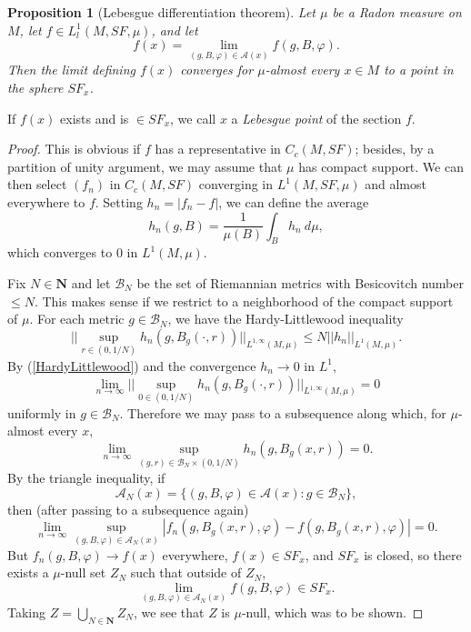 \documentclass[reqno,12pt,letterpaper]{amsart}
\newcommand{\NN}{\mathbf{N}}
\newcommand{\dfn}[1]{\emph{#1}\index{#1}}
\newtheorem{proposition}[theorem]{Proposition}
\theoremstyle{definition}
\numberwithin{equation}{section}
\begin{document}
\begin{proposition}[Lebesgue differentiation theorem]
Let $\mu$ be a Radon measure on $M$, let $f \in L^1_l(M, SF, \mu)$, and let
$$f(x) = \lim_{(g, B, \varphi) \in \mathcal A(x)} f(g, B, \varphi).$$
Then the limit defining $f(x)$ converges for $\mu$-almost every $x \in M$ to a point in the sphere $SF_x$.
\end{proposition}
If $f(x)$ exists and is $\in SF_x$, we call $x$ a \dfn{Lebesgue point} of the section $f$.
\begin{proof}
This is obvious if $f$ has a representative in $C_c(M, SF)$; besides, by a partition of unity argument, we may assume that $\mu$ has compact support.
We can then select $(f_n)$ in $C_c(M, SF)$ converging in $L^1(M, SF, \mu)$ and almost everywhere to $f$.
Setting $h_n = |f_n - f|$, we can define the average
$$h_n(g, B) = \frac{1}{\mu(B)} \int_B h_n ~d\mu,$$
which converges to $0$ in $L^1(M, \mu)$.

Fix $N \in \NN$ and let $\mathcal B_N$ be the set of Riemannian metrics with Besicovitch number $\leq N$.
This makes sense if we restrict to a neighborhood of the compact support of $\mu$.
For each metric $g \in \mathcal B_N$, we have the Hardy-Littlewood inequality \cite[Lemma 4.1.1a]{Ledrappier85}
\begin{equation}\label{HardyLittlewood}
||\sup_{r \in (0, 1/N)} h_n(g, B_g(\cdot, r))||_{L^{1, \infty}(M, \mu)} \leq N ||h_n||_{L^1(M, \mu)}.
\end{equation}
By (\ref{HardyLittlewood}) and the convergence $h_n \to 0$ in $L^1$,
$$\lim_{n \to \infty} ||\sup_{0 \in (0, 1/N)} h_n(g, B_g(\cdot, r))||_{L^{1, \infty}(M, \mu)} = 0$$
uniformly in $g \in \mathcal B_N$.
Therefore we may pass to a subsequence along which, for $\mu$-almost every $x$,
$$\lim_{n \to \infty} \sup_{(g, r) \in \mathcal B_N \times (0, 1/N)} h_n(g, B_g(x, r)) = 0.$$
By the triangle inequality, if
$$\mathcal A_N(x) = \{(g, B, \varphi) \in \mathcal A(x): g \in \mathcal B_N\},$$
then (after passing to a subsequence again)
$$\lim_{n \to \infty} \sup_{(g, B, \varphi) \in \mathcal A_N(x)} |f_n(g, B_g(x, r), \varphi) - f(g, B_g(x, r), \varphi)| = 0.$$
But $f_n(g, B, \varphi) \to f(x)$ everywhere, $f(x) \in SF_x$, and $SF_x$ is closed, so there exists a $\mu$-null set $Z_N$ such that outside of $Z_N$,
$$\lim_{(g, B, \varphi) \in \mathcal A_N(x)} f(g, B, \varphi) \in SF_x.$$
Taking $Z = \bigcup_{N \in \NN} Z_N$, we see that $Z$ is $\mu$-null, which was to be shown.
\end{proof}
\end{document}
